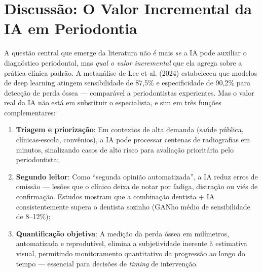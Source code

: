 
\section{Discussão: O Valor Incremental da IA em Periodontia}

A questão central que emerge da literatura não é mais \textit{se} a IA pode auxiliar o diagnóstico periodontal, mas \textit{qual o valor incremental} que ela agrega sobre a prática clínica padrão. A metanálise de Lee et al. (2024) estabeleceu que modelos de deep learning atingem sensibilidade de 87,5\% e especificidade de 90,2\% para detecção de perda óssea --- comparável a periodontistas experientes. Mas o valor real da IA não está em substituir o especialista, e sim em três funções complementares:

\begin{enumerate}
    \item \textbf{Triagem e priorização}: Em contextos de alta demanda (saúde pública, clínicas-escola, convênios), a IA pode processar centenas de radiografias em minutos, sinalizando casos de alto risco para avaliação prioritária pelo periodontista;

    \item \textbf{Segundo leitor}: Como ``segunda opinião automatizada'', a IA reduz erros de omissão --- lesões que o clínico deixa de notar por fadiga, distração ou viés de confirmação. Estudos mostram que a combinação dentista + IA consistentemente supera o dentista sozinho (GANho médio de sensibilidade de 8--12\%);

    \item \textbf{Quantificação objetiva}: A medição da perda óssea em milímetros, automatizada e reprodutível, elimina a subjetividade inerente à estimativa visual, permitindo monitoramento quantitativo da progressão ao longo do tempo --- essencial para decisões de \textit{timing} de intervenção.
\end{enumerate}

